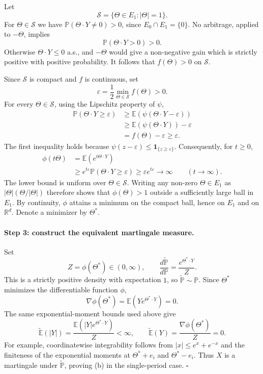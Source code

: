 \documentclass[11pt,a4paper]{article}
\begin{document}
Let
\[
\mathcal S=\{\Theta\in E_1:|\Theta|=1\}.
\]
For $\Theta\in\mathcal S$ we have
$\mathbb P(\Theta\cdot Y\neq0)>0$, since
$E_0\cap E_1=\{0\}$. No arbitrage, applied to $-\Theta$, implies
\[
\mathbb P(\Theta\cdot Y>0)>0.
\]
Otherwise $\Theta\cdot Y\leq0$ a.s., and $-\Theta$ would give a
non-negative gain which is strictly positive with positive probability.
It follows that $f(\Theta)>0$ on $\mathcal S$.

Since $\mathcal S$ is compact and $f$ is continuous, set
\[
\varepsilon=\frac12\min_{\Theta\in\mathcal S}f(\Theta)>0.
\]
For every $\Theta\in\mathcal S$, using the Lipschitz property of $\psi$,
\[
\begin{aligned}
\mathbb P(\Theta\cdot Y\geq\varepsilon)
&\geq\mathbb E\!\left(\psi(\Theta\cdot Y-\varepsilon)\right)\\
&\geq\mathbb E\!\left(\psi(\Theta\cdot Y)\right)-\varepsilon\\
&=f(\Theta)-\varepsilon\geq\varepsilon.
\end{aligned}
\]
The first inequality holds because
$\psi(z-\varepsilon)\leq\mathbf1_{\{z\geq\varepsilon\}}$.
Consequently, for $t\geq0$,
\[
\begin{aligned}
\phi(t\Theta)
&=\mathbb E\!\left(e^{t\Theta\cdot Y}\right)\\
&\geq e^{t\varepsilon}
   \mathbb P(\Theta\cdot Y\geq\varepsilon)
\geq\varepsilon e^{t\varepsilon}
\longrightarrow\infty\qquad(t\to\infty).
\end{aligned}
\]
The lower bound is uniform over $\Theta\in\mathcal S$. Writing any
non-zero $\Theta\in E_1$ as $|\Theta|(\Theta/|\Theta|)$ therefore shows
that $\phi(\Theta)>1$ outside a sufficiently large ball in $E_1$.
By continuity, $\phi$ attains a minimum on the compact ball, hence on
$E_1$ and on $\mathbb R^d$. Denote a minimizer by $\Theta^*$.

\paragraph{Step 3: construct the equivalent martingale measure.}
Set
\[
Z=\phi(\Theta^*)\in(0,\infty),\qquad
\frac{d\widetilde{\mathbb P}}{d\mathbb P}
=\frac{e^{\Theta^*\cdot Y}}{Z}.
\]
This is a strictly positive density with expectation $1$, so
$\widetilde{\mathbb P}\sim\mathbb P$.
Since $\Theta^*$ minimizes the differentiable function $\phi$,
\[
\nabla\phi(\Theta^*)
=\mathbb E\!\left(Y e^{\Theta^*\cdot Y}\right)=0.
\]
The same exponential-moment bounds used above give
\[
\widetilde{\mathbb E}(|Y|)
=\frac{\mathbb E\!\left(|Y|e^{\Theta^*\cdot Y}\right)}{Z}
<\infty,
\qquad
\widetilde{\mathbb E}(Y)
=\frac{\nabla\phi(\Theta^*)}{Z}=0.
\]
For example, coordinatewise integrability follows from
$|x|\leq e^x+e^{-x}$ and the finiteness of the exponential moments at
$\Theta^*+e_i$ and $\Theta^*-e_i$.
Thus $X$ is a martingale under $\widetilde{\mathbb P}$, proving (b)
in the single-period case.
\hfill$\square$
\end{document}
